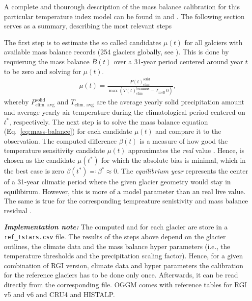             A complete and thourough description of the mass balance calibration for this particular temperature index model can be found in \citet[][Section 2.1.9 and 2.1.10]{Marzeion2012b} and \citet[][Section 3.3]{Maussion2019}. The following section serves as a summary, describing the most relevant steps
            
            The first step is to estimate the so called candidates $\mu(t)$ for all galciers with available mass balance records (254 glaciers globally, see \citet{WGMS2017}). This is done by requierung the mass balance $\bar B(t)$ over a 31-year period centered around year $t$ to be zero and solving for $\mu(t)$.
            \begin{align}\label{eq:mu-candidates}
                \mu(t) = \frac{P(t)_\text{clim}^\text{solid}}{\max(T(t)_\text{clim}^\text{terminus} - T_\text{melt}\, 0)},
            \end{align}
            whereby $P_{\text{clim. avg}}^{\text{solid}}$ and $T_{\text{clim. avg}}^{\text{}}$ are the average yearly solid precipitation amount and average yearly air temperature during the climatological period centered on $t^*$, respectively. The next step is to solve the mass balance equation (Eq.~\ref{eq:mass-balance}) for each candidate $\mu(t)$ and compare it to the observation. The computed difference $\beta(t)$ is a measure of how good the temperature sensitivity candidate $\mu(t)$ approximates the \textit{real} value \mustar{}. Hence, \mustar{} is chosen as the candidate $\mu(t^*)$ for which the absolute bias is minimal, which in the best case is zero $\beta(t^*) \eqqcolon \beta^* \approx 0$. The \textit{equilibrium year} \tstar{} represents the center of a 31-year climatic period where the given glacier geometry would stay in equilibirum. However, this is more of a model parameter than an real live value. The same is true for the corresponding tempreature senistivity \mustar{} and mass balance residual \bias{}.

            \textit{\textbf{Implementation note:}} The computed \tstar{} and \bias{} for each glacier are store in a \lstinline`ref_tstars.csv` file. The results of the steps above depend on the glacier outlines, the climate data and the mass balance hyper parameters (i.e., the temperature thresholds and the precipitation scaling factor). Hence, for a given combination of RGI version, climate data and hyper parameters the calibration for the reference glaciers has to be done only once. Afterwards, it can be read directly from the corresponding file. OGGM comes with reference tables for RGI v5 and v6 and CRU4 and HISTALP.

